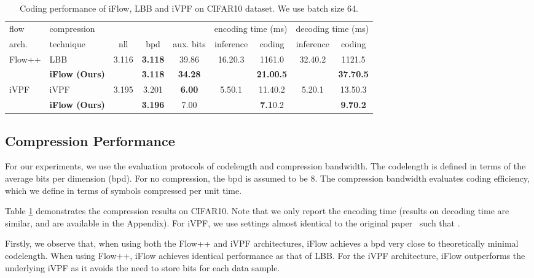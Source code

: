 \documentclass{article}
\newcommand{\ebar}[1]{{\tiny #1}}
\begin{document}
\begin{table}[t]
\centering
\small
\caption{Coding performance of iFlow, LBB and iVPF on CIFAR10 dataset. We use batch size 64.}
\label{tab:baselines}
\begin{tabular}{llccccccc}
\toprule
flow & compression & & & & \multicolumn{2}{c}{encoding time (ms)} & \multicolumn{2}{c}{decoding time (ms)}\\
arch. & technique & nll & bpd & aux. bits & inference & coding &  inference & coding \\
\midrule
\multirow{2}{*}{Flow++} & LBB~\cite{ho2019compression} & \multirow{2}{*}{3.116} & \textbf{3.118} & 39.86 & \multirow{2}{*}{16.2\ebar{0.3}} & 116\ebar{1.0} & \multirow{2}{*}{32.4\ebar{0.2}} & 112\ebar{1.5} \\
 & \textbf{iFlow (Ours)} & & \textbf{3.118} & \textbf{34.28} & & \textbf{21.0\ebar{0.5}} & & \textbf{37.7\ebar{0.5}} \\
\midrule
\multirow{2}{*}{iVPF} & iVPF~\cite{zhang2021ivpf} & \multirow{2}{*}{3.195} & 3.201 & \textbf{6.00} & \multirow{2}{*}{5.5\ebar{0.1}} & 11.4\ebar{0.2} & \multirow{2}{*}{5.2\ebar{0.1}} & 13.5\ebar{0.3} \\
 & \textbf{iFlow (Ours)} & & \textbf{3.196} & 7.00 & & \textbf{7.1}\ebar{0.2} & & \bf 9.7\ebar{0.2} \\
\bottomrule
\end{tabular}
\end{table}



\subsection{Compression Performance}

For our experiments, we use the evaluation protocols of codelength and compression bandwidth. The codelength is defined in terms of the average bits per dimension (bpd). For no compression, the bpd is assumed to be 8. 
The compression bandwidth evaluates coding efficiency, which we define in terms of symbols compressed per unit time.

Table \ref{tab:baselines} demonstrates the compression results on CIFAR10. Note that we only report the encoding time (results on decoding time are similar, and are available in the Appendix). For iVPF, we use settings almost identical to the original paper~\cite{zhang2021ivpf} such that . 

Firstly, we observe that, when using both the Flow++ and iVPF architectures, iFlow achieves a bpd very close to theoretically minimal codelength. When using Flow++, iFlow achieves identical performance as that of LBB. For the iVPF architecture, iFlow outperforms the underlying iVPF as it avoids the need to store  bits for each data sample. 
\end{document}
